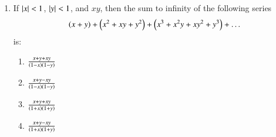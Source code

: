\documentclass[journal]{IEEEtran}
\begin{document}
\begin{enumerate}
\item If $\left\vert x\right\vert < 1$, $\left\vert y\right\vert < 1$, and $xy$, then the sum to infinity of the following series 
\begin{align}
    \left(x+y\right) + \left(x^2+xy+y^2\right) + \left(x^3 + x^2y + xy^2 + y^3\right) + \dots
\end{align}
is:
\begin{multicols}{2}
    \begin{enumerate}
        \item $\frac{x+y+xy}{\left(1-x\right)\left(1-y\right)}$
        \item $\frac{x+y-xy}{\left(1-x\right)\left(1-y\right)}$
        \item $\frac{x+y+xy}{\left(1+x\right)\left(1+y\right)}$
        \item $\frac{x+y-xy}{\left(1+x\right)\left(1+y\right)}$
    \end{enumerate}
\end{multicols}
\end{enumerate}
\end{document}
